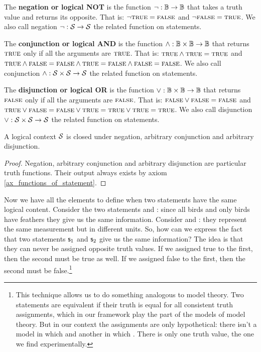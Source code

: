 \documentclass[11pt,letterpaper,fleqn]{memoir} %
\begin{document}
\begin{mathSection}
	\begin{defn}
		The \textbf{negation or logical NOT} is the function $\neg : \mathbb{B} \to \mathbb{B}$ that takes a truth value and returns its opposite. That is: $\neg \textsc{true} = \textsc{false}$ and $\neg \textsc{false} = \textsc{true}$. We also call negation $\neg: \mathcal{S} \to \mathcal{S}$ the related function on statements.
	\end{defn}
	
	\begin{defn}
		The \textbf{conjunction or logical AND} is the function $\wedge : \mathbb{B} \times \mathbb{B} \to \mathbb{B}$ that returns $\textsc{true}$ only if all the arguments are $\textsc{true}$. That is: $\textsc{true} \wedge \textsc{true} = \textsc{true}$ and $\textsc{true} \wedge \textsc{false} =\textsc{false} \wedge \textsc{true} =\textsc{false} \wedge \textsc{false} = \textsc{false}$. We also call conjunction $\wedge : \mathcal{S} \times \mathcal{S} \to \mathcal{S}$ the related function on statements.
	\end{defn}
	
	\begin{defn}
		The \textbf{disjunction or logical OR} is the function $\vee : \mathbb{B} \times \mathbb{B} \to \mathbb{B}$ that returns $\textsc{false}$ only if all the arguments are $\textsc{false}$. That is: $\textsc{false} \vee \textsc{false} = \textsc{false}$ and $\textsc{true} \vee \textsc{false} =\textsc{false} \vee \textsc{true} =\textsc{true} \vee \textsc{true} = \textsc{true}$.  We also call disjunction $\vee : \mathcal{S} \times \mathcal{S} \to \mathcal{S}$ the related function on statements.
	\end{defn}

	\begin{prop}
	A logical context $\mathcal{S}$ is closed under negation, arbitrary conjunction and arbitrary disjunction.
\end{prop}
\begin{proof}
	Negation, arbitrary conjunction and arbitrary disjunction are particular truth functions. Their output always exists by axiom \eqref{ax_functions_of_statement}.
\end{proof}\end{mathSection}

Now we have all the elements to define when two statements have the same logical content. Consider the two statements  and : since all birds and only birds have feathers they give us the same information. Consider  and : they represent the same measurement but in different units. So, how can we express the fact that two statements $\mathsf{s}_1$ and $\mathsf{s}_2$ give us the same information? The idea is that they can never be assigned opposite truth values. If we assigned true to the first, then the second must be true as well. If we assigned false to the first, then the second must be false.\footnote{This technique allows us to do something analogous to model theory. Two statements are equivalent if their truth is equal for all consistent truth assignments, which in our framework play the part of the models of model theory. But in our context the assignments are only hypothetical: there isn't a model in which  and another in which . There is only one truth value, the one we find experimentally.}
\end{document}
